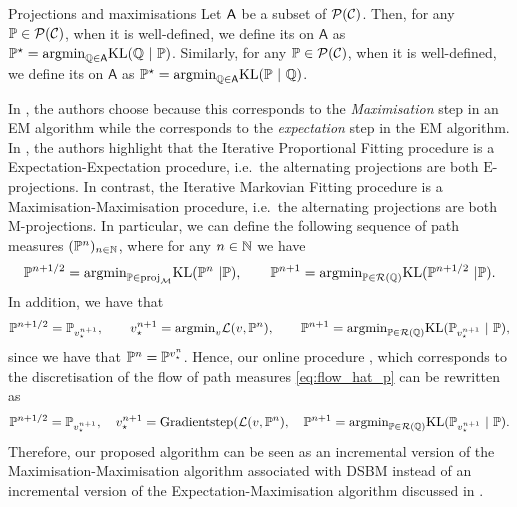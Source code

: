 \documentclass{article}
\begin{document}
\begin{definition}{Projections and maximisations}{}
 Let $\mathsf{A}$ be a subset of $\mathcal{P}(\mathcal{C})$. Then, for any $\mathbb{P} \in \mathcal{P}(\mathcal{C})$, when it is well-defined, we define its \Eproj on $\mathsf{A}$ as $\mathbb{P}^\star = \mathrm{argmin}_{\mathbb{Q} \in \mathsf{A}} \mathrm{KL}(\mathbb{Q} \ | \ \mathbb{P})$. Similarly, for any $\mathbb{P} \in \mathcal{P}(\mathcal{C})$, when it is well-defined, we define its \Mproj on $\mathsf{A}$ as $\mathbb{P}^\star = \mathrm{argmin}_{\mathbb{Q} \in \mathsf{A}} \mathrm{KL}(\mathbb{P} \ | \ \mathbb{Q})$.   
\end{definition}

In \cite{brekelmans2023schrodinger}, the authors choose \Mproj because this corresponds to the \emph{Maximisation} step in an EM algorithm while the \Eproj corresponds to the \emph{expectation} step in the EM algorithm. In \cite{brekelmans2023schrodinger}, the authors highlight that the Iterative Proportional Fitting procedure is a Expectation-Expectation procedure, i.e.~the alternating projections are both $\mathrm{E}$-projections. In contrast, the Iterative Markovian Fitting procedure is a Maximisation-Maximisation procedure, i.e.~the alternating projections are both $\mathrm{M}$-projections. In particular, we can define the following sequence of path measures $(\mathbb{P}^n)_{n \in \mathbb{N}}$, where for any $n \in \mathbb{N}$ we have
\begin{equation}
    \mathbb{P}^{n+1/2} = \mathrm{argmin}_{\mathbb{P} \in \mathrm{proj}_{\mathcal{M}}}\mathrm{KL}(\mathbb{P}^n \ | \mathbb{P}) , \qquad \mathbb{P}^{n+1} = \mathrm{argmin}_{\mathbb{P} \in \mathcal{R}(\mathbb{Q})}\mathrm{KL}(\mathbb{P}^{n+1/2} \ | \mathbb{P}) .  
\end{equation}
In addition, we have that 
\begin{equation}
    \mathbb{P}^{n+1/2} = \mathbb{P}_{v_\star^{n+1}}, \qquad v_\star^{n+1} = \mathrm{argmin}_v \mathcal{L}(v, \mathbb{P}^{n}) , \qquad \mathbb{P}^{n+1} = \mathrm{argmin}_{\mathbb{P} \in \mathcal{R}(\mathbb{Q})}\mathrm{KL}(\mathbb{P}_{v_\star^{n+1}} \ | \ \mathbb{P})  ,
\end{equation}
since we have that $\mathbb{P}^n = \mathbb{P}^{v_\star^n}$. Hence, our online procedure , which corresponds to the discretisation of the flow of path measures \eqref{eq:flow_hat_p} can be rewritten as 
\begin{equation}
    \mathbb{P}^{n+1/2} = \mathbb{P}_{v_\star^{n+1}}, \quad v_\star^{n+1} = \mathrm{Gradientstep}(\mathcal{L}(v, \mathbb{P}^n) , \quad \mathbb{P}^{n+1} = \mathrm{argmin}_{\mathbb{P} \in \mathcal{R}(\mathbb{Q})}\mathrm{KL}(\mathbb{P}_{v_\star^{n+1}} \ | \ \mathbb{P}) .  
\end{equation}
Therefore, our proposed algorithm can be seen as an incremental version of the Maximisation-Maximisation algorithm associated with DSBM instead of an incremental version of the Expectation-Maximisation algorithm discussed in \citep{neal1998view}.
\end{document}
